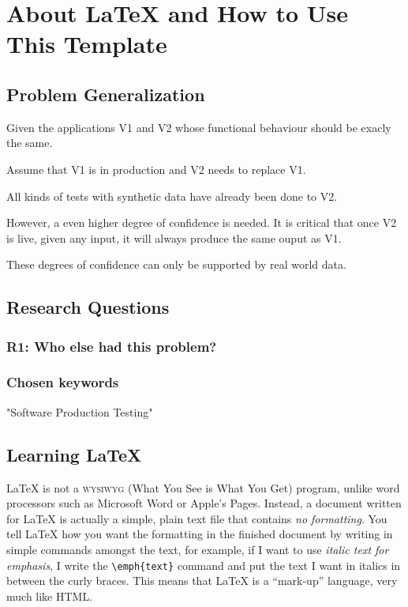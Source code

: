 
\chapter{About \LaTeX{} and How to Use This Template} %

\label{chap:Chapter2} %


\section{Problem Generalization}

Given the applications V1 and V2 whose functional behaviour should be exacly the same. 

Assume that V1 is in production and V2 needs to replace V1.

All kinds of tests with synthetic data have already been done to V2.  

However, a even higher degree of confidence is needed. It is critical that once V2 is live, given any input, it will always produce the same ouput as V1. 

These degrees of confidence can only be supported by real world data.

\section{Research Questions}

\subsection{R1: Who else had this problem?}


\subsection{Chosen keywords}

"Software Production Testing"


\section{Learning \LaTeX{}}

\LaTeX{} is not a \textsc{wysiwyg} (What You See is What You Get) program, unlike word processors such as Microsoft Word or Apple's Pages. Instead, a document written for \LaTeX{} is actually a simple, plain text file that contains \emph{no formatting}. You tell \LaTeX{} how you want the formatting in the finished document by writing in simple commands amongst the text, for example, if I want to use \emph{italic text for emphasis}, I write the \verb|\emph{text}| command and put the text I want in italics in between the curly braces. This means that \LaTeX{} is a \enquote{mark-up} language, very much like HTML.

